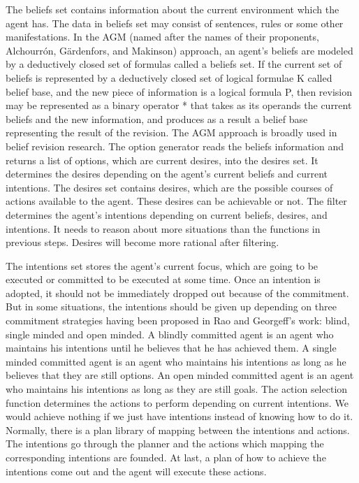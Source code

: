 The beliefs set contains information about the current environment which the agent has. The data in beliefs set may consist of sentences, rules or some other manifestations. In the AGM (named after the names of their proponents, Alchourrón, Gärdenfors, and Makinson)\cite{alchourron_revision_1985} approach, an agent’s beliefs are modeled by a deductively closed set of formulas called a beliefs set\cite{James_revise_2011}.
If the current set of beliefs is represented by a deductively closed set of logical formulae K called belief base, and the new piece of information is a logical formula P, then revision may be represented as a binary operator * that takes as its operands the current beliefs and the new information, and produces as a result a belief base representing the result of the revision\cite{M_Belief}. The AGM approach is broadly used in belief revision research.
The option generator reads the beliefs information and returns a list of options, which are current desires, into the desires set. It determines the desires depending on the agent’s current beliefs and current intentions. The desires set contains desires, which are the possible courses of actions available to the agent. These desires can be achievable or not. The filter determines the agent’s intentions depending on current beliefs, desires, and intentions. It needs to reason about more situations than the functions in previous steps. Desires will become more rational after filtering.

The intentions set stores the agent’s current focus, which are going to be executed or committed to be executed at some time. Once an intention is adopted, it should not be immediately dropped out because of the commitment. But in some situations, the intentions should be given up depending on  three commitment strategies having been proposed in Rao and Georgeff’s work:  blind, single minded and open minded. A blindly committed agent is an agent who maintains his intentions until he believes that he has achieved them. A single minded committed agent is an agent who maintains his intentions as long as he believes that they are still options. An open minded committed agent is an agent who maintains his intentions as long as they are still goals\cite{Roberto_BDIATL_2005}. The action selection function determines the actions to perform depending on current intentions. We would achieve nothing if we just have intentions instead of knowing how to do it. Normally, there is a plan library of mapping between the intentions and actions. The intentions go through the planner and the actions which mapping the corresponding intentions are founded. At last, a plan of how to achieve the intentions come out and the agent will execute these actions.

